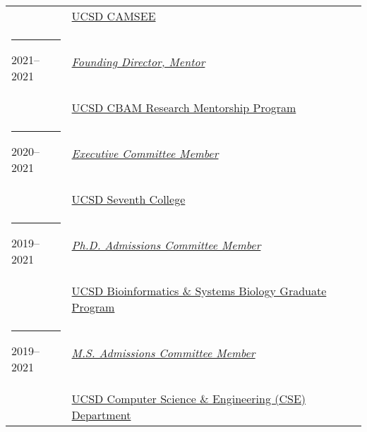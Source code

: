 \documentclass[margin,line]{res}
\begin{document}
\begin{resume}
\begin{longtable}{@{}p{0.7in}p{4in}}
\hspace*{-4mm} & \hspace{4mm} \href{https://camsee.ucsd.edu/}{UCSD CAMSEE}\\
\hspace*{-4mm} \rule{-1mm}{5mm} 2021--2021 & \href{https://sites.google.com/eng.ucsd.edu/cbam}{\textit{Founding Director, Mentor}}\\*
\hspace*{-4mm} & \hspace{4mm} \href{https://sites.google.com/eng.ucsd.edu/cbam}{UCSD CBAM Research Mentorship Program}\\
\hspace*{-4mm} \rule{-1mm}{5mm} 2020--2021 & \href{https://seventh.ucsd.edu/about/faculty/index.html#Executive-Committee}{\textit{Executive Committee Member}}\\*
\hspace*{-4mm} & \hspace{4mm} \href{https://seventh.ucsd.edu/}{UCSD Seventh College}\\
\hspace*{-4mm} \rule{-1mm}{5mm} 2019--2021 & \href{https://bioinformatics.ucsd.edu/}{\textit{Ph.D. Admissions Committee Member}}\\*
\hspace*{-4mm} & \hspace{4mm} \href{https://bioinformatics.ucsd.edu/}{UCSD Bioinformatics \& Systems Biology Graduate Program}\\
\hspace*{-4mm} \rule{-1mm}{5mm} 2019--2021 & \href{https://cse.ucsd.edu/graduate/degree-programs/ms-program}{\textit{M.S. Admissions Committee Member}}\\*
\hspace*{-4mm} & \hspace{4mm} \href{http://cse.ucsd.edu}{UCSD Computer Science \& Engineering (CSE) Department}\\
\end{longtable}


\end{resume}
\end{document}
